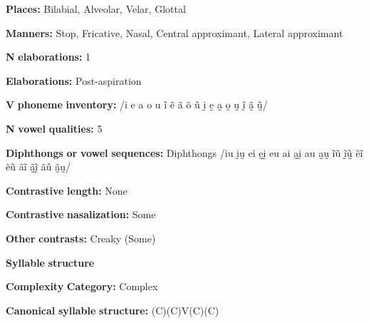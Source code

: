\documentclass[output=paper]{langsci/langscibook}
\begin{document}
\begin{styleBody}
\textbf{Places:} Bilabial, Alveolar, Velar, Glottal
\end{styleBody}

\begin{styleBody}
\textbf{Manners:} Stop, Fricative, Nasal, Central approximant, Lateral approximant
\end{styleBody}

\begin{styleBody}
\textbf{N} \textbf{elaborations:} 1
\end{styleBody}

\begin{styleBody}
\textbf{Elaborations:} Post-aspiration
\end{styleBody}

\begin{styleBody}
\textbf{V} \textbf{phoneme} \textbf{inventory:} /i e a o u ĩ ẽ ã õ ũ ḭ ḛ a̰ o̰ ṵ ḭ̃ ã̰ ṵ̃/
\end{styleBody}

\begin{styleBody}
\textbf{N} \textbf{vowel} \textbf{qualities:} 5
\end{styleBody}

\begin{styleBody}
\textbf{Diphthongs} \textbf{or} \textbf{vowel} \textbf{sequences:} Diphthongs /iu ḭṵ ei ḛḭ eu ai a̰ḭ au a̰ṵ ĩũ ḭ̃ṵ̃ ẽĩ ẽũ ãĩ ã̰ḭ̃ ãũ ã̰ṵ/
\end{styleBody}

\begin{styleBody}
\textbf{Contrastive} \textbf{length:} None
\end{styleBody}

\begin{styleBody}
\textbf{Contrastive} \textbf{nasalization:} Some
\end{styleBody}

\begin{styleBody}
\textbf{Other} \textbf{contrasts:} Creaky (Some)
\end{styleBody}

\begin{styleBody}
\textbf{Syllable} \textbf{structure}
\end{styleBody}

\begin{styleBody}
\textbf{Complexity} \textbf{Category:} Complex
\end{styleBody}

\begin{styleBody}
\textbf{Canonical} \textbf{syllable} \textbf{structure:} (C)(C)V(C)(C) \citep[124-34]{Eberhard2009}
\end{styleBody}
\end{document}
